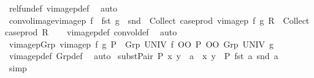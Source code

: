 \begin{isabellebody}
\ rel{\isacharunderscore}{\kern0pt}fun{\isacharunderscore}{\kern0pt}def\ vimage{}p{\isacharunderscore}{\kern0pt}def\ \isamarkupfalse%
\ auto%
\endisatagproof
{\isafoldproof}%
%
\isadelimproof
\isanewline
%
\endisadelimproof
\isanewline
{}\isamarkupfalse%
\ convol{\isacharunderscore}{\kern0pt}image{\isacharunderscore}{\kern0pt}vimage{}p{\isacharcolon}{\kern0pt}\ {\isachardoublequoteopen}{\isasymlangle}f\ {\isasymcirc}\ fst{\isacharcomma}{\kern0pt}\ g\ {\isasymcirc}\ snd{\isasymrangle}\ {\isacharbackquote}{\kern0pt}\ Collect\ {\isacharparenleft}{\kern0pt}case{\isacharunderscore}{\kern0pt}prod\ {\isacharparenleft}{\kern0pt}vimage{}p\ f\ g\ R{\isacharparenright}{\kern0pt}{\isacharparenright}{\kern0pt}\ {\isasymsubseteq}\ Collect\ {\isacharparenleft}{\kern0pt}case{\isacharunderscore}{\kern0pt}prod\ R{\isacharparenright}{\kern0pt}{\isachardoublequoteclose}\isanewline
%
\isadelimproof
\ \ %
\endisadelimproof
%
\isatagproof
{}\isamarkupfalse%
\ vimage{}p{\isacharunderscore}{\kern0pt}def\ convol{\isacharunderscore}{\kern0pt}def\ \isamarkupfalse%
\ auto%
\endisatagproof
{\isafoldproof}%
%
\isadelimproof
\isanewline
%
\endisadelimproof
\isanewline
{}\isamarkupfalse%
\ vimage{}p{\isacharunderscore}{\kern0pt}Grp{\isacharcolon}{\kern0pt}\ {\isachardoublequoteopen}vimage{}p\ f\ g\ P\ {\isacharequal}{\kern0pt}\ Grp\ UNIV\ f\ OO\ P\ OO\ {\isacharparenleft}{\kern0pt}Grp\ UNIV\ g{\isacharparenright}{\kern0pt}{\isasyminverse}{\isasyminverse}{\isachardoublequoteclose}\isanewline
%
\isadelimproof
\ \ %
\endisadelimproof
%
\isatagproof
{}\isamarkupfalse%
\ vimage{}p{\isacharunderscore}{\kern0pt}def\ Grp{\isacharunderscore}{\kern0pt}def\ \isamarkupfalse%
\ auto%
\endisatagproof
{\isafoldproof}%
%
\isadelimproof
\isanewline
%
\endisadelimproof
\isanewline
{}\isamarkupfalse%
\ subst{\isacharunderscore}{\kern0pt}Pair{\isacharcolon}{\kern0pt}\ {\isachardoublequoteopen}P\ x\ y\ {\isasymLongrightarrow}\ a\ {\isacharequal}{\kern0pt}\ {\isacharparenleft}{\kern0pt}x{\isacharcomma}{\kern0pt}\ y{\isacharparenright}{\kern0pt}\ {\isasymLongrightarrow}\ P\ {\isacharparenleft}{\kern0pt}fst\ a{\isacharparenright}{\kern0pt}\ {\isacharparenleft}{\kern0pt}snd\ a{\isacharparenright}{\kern0pt}{\isachardoublequoteclose}\isanewline
%
\isadelimproof
\ \ %
\endisadelimproof
%
\isatagproof
{}\isamarkupfalse%
\ simp%
\endisatagproof
{\isafoldproof}%
%
\isadelimproof
\isanewline

\end{isabellebody}
